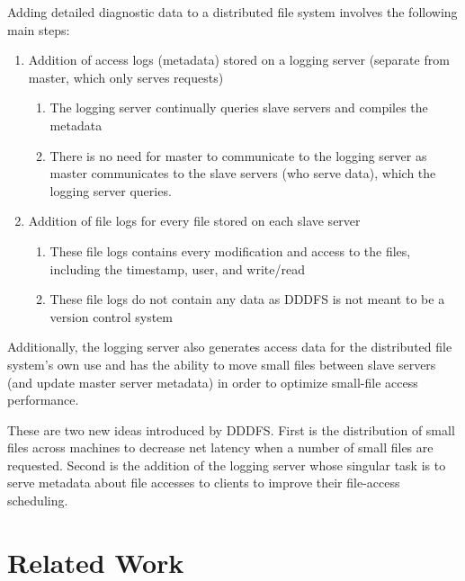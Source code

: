 \documentclass{article}
\begin{document}
Adding detailed diagnostic data to a distributed file system involves the following main steps:

\begin{enumerate}
\item Addition of access logs (metadata) stored on a logging server (separate from master, which only serves requests)
	\begin{enumerate}
	\item The logging server continually queries slave servers and compiles the metadata
	\item There is no need for master to communicate to the logging server as master communicates to the slave servers (who serve data), which the logging server queries. 
	\end{enumerate}
\item Addition of file logs for every file stored on each slave server
	\begin{enumerate}
	\item These file logs contains every modification and access to the files, including the timestamp, user, and write/read
	\item These file logs do not contain any data as DDDFS is not meant to be a version control system
	\end{enumerate}
\end{enumerate}

Additionally, the logging server also generates access data for the distributed file system's own use and has the ability to move small files between slave servers (and update master server metadata) in order to optimize small-file access performance. 

These are two new ideas introduced by DDDFS. First is the distribution of small files across machines to decrease net latency when a number of small files are requested. Second is the addition of the logging server whose singular task is to serve metadata about file accesses to clients to improve their file-access scheduling. 

\section{Related Work}
\end{document}
